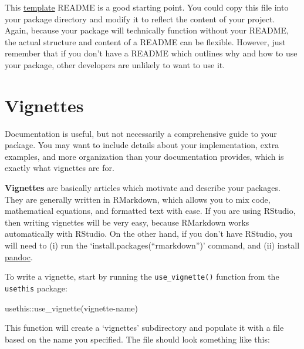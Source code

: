 \documentclass[
]{book}
\newenvironment{Shaded}{\begin{snugshade}}{\end{snugshade}}
\newcommand{\FunctionTok}[1]{\textcolor[rgb]{0.00,0.00,0.00}{#1}}
\newcommand{\NormalTok}[1]{#1}
\newcommand{\SpecialCharTok}[1]{\textcolor[rgb]{0.00,0.00,0.00}{#1}}
\newcommand{\StringTok}[1]{\textcolor[rgb]{0.31,0.60,0.02}{#1}}
\begin{document}
This \href{https://gist.github.com/PurpleBooth/109311bb0361f32d87a2}{template} README is a good starting point. You could copy this file into your package directory and modify it to reflect the content of your project. Again, because your package will technically function without your README, the actual structure and content of a README can be flexible. However, just remember that if you don't have a README which outlines why and how to use your package, other developers are unlikely to want to use it.

\hypertarget{vignettes}{%
\section{Vignettes}\label{vignettes}}

Documentation is useful, but not necessarily a comprehensive guide to your package. You may want to include details about your implementation, extra examples, and more organization than your documentation provides, which is exactly what vignettes are for.

\textbf{Vignettes} are basically articles which motivate and describe your packages. They are generally written in RMarkdown, which allows you to mix code, mathematical equations, and formatted text with ease. If you are using RStudio, then writing vignettes will be very easy, because RMarkdown works automatically with RStudio. On the other hand, if you don't have RStudio, you will need to (i) run the `install.packages(``rmarkdown'')' command, and (ii) install \href{http://pandoc.org/installing.html}{pandoc}.

To write a vignette, start by running the \texttt{use\_vignette()} function from the \texttt{usethis} package:

\begin{Shaded}
\begin{Highlighting}[]
\NormalTok{usethis}\SpecialCharTok{::}\FunctionTok{use\_vignette}\NormalTok{(}\StringTok{\textquotesingle{}vignette{-}name\textquotesingle{}}\NormalTok{)}
\end{Highlighting}
\end{Shaded}

This function will create a `vignettes' subdirectory and populate it with a file based on the name you specified. The file should look something like this:
\end{document}
